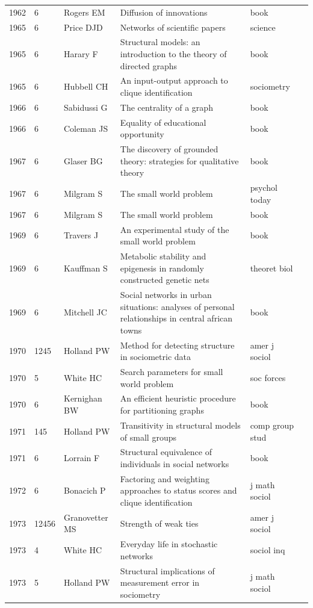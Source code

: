 \documentclass[11pt]{article} %
\begin{document}
\begin{landscape}
\begin{longtable}{p{0.7cm}|p{0.8cm}|p{3cm}|p{14.5cm}|p{3.5cm}l}
1962& 	6& 	 Rogers EM& 	 Diffusion of innovations& 	 book\\
1965& 	6& 	 Price DJD& 	 Networks of scientific papers& 	 science\\
1965& 	6& 	 Harary F& 	 Structural models: an introduction to the theory of directed graphs& 	 book\\
1965& 	6& 	 Hubbell CH & 	An input-output approach to clique identification& 	 sociometry\\
1966& 	6& 	 Sabidussi G& 	 The centrality of a graph& 	 book\\
1966& 	6& 	 Coleman JS& 	 Equality of educational opportunity& 	 book\\
1967& 	6& 	 Glaser BG& 	 The discovery of grounded theory: strategies for qualitative theory& 	 book\\
1967& 	6& 	 Milgram S& 	 The small world problem& 	 psychol today\\
1967& 	6& 	 Milgram S& 	 The small world problem& 	 book\\
1969& 	6& 	 Travers J& 	 An experimental study of the small world problem& 	 book\\
1969& 	6& 	 Kauffman S& 	 Metabolic stability and epigenesis in randomly constructed genetic nets& 	 theoret biol \\
1969& 	6& 	 Mitchell JC& 	 Social networks in urban situations: analyses of personal relationships in central african towns& 	 book\\
1970& 	1245& 	 Holland PW& 	 Method for detecting structure in sociometric data& 	 amer j sociol\\
1970& 	5& 	 White HC& 	 Search parameters for small world problem& 	 soc forces\\
1970& 	6& 	 Kernighan BW& 	 An efficient heuristic procedure for partitioning graphs& 	 book\\
1971& 	145& 	 Holland PW& 	 Transitivity in structural models of small groups& 	 comp group stud\\
1971& 	6& 	 Lorrain F & 	 Structural equivalence of individuals in social networks& 	 book\\
1972& 	6& 	 Bonacich P& 	 Factoring and weighting approaches to status scores and clique identification& 	 j math sociol\\
1973& 	12456& 	 Granovetter MS& 	 Strength of weak ties& 	 amer j sociol\\
1973& 	4& 	 White HC& 	 Everyday life in stochastic networks& 	 sociol inq\\
1973& 	5& 	 Holland PW& 	 Structural implications of measurement error in sociometry& 	 j math sociol\\

\end{longtable}
\end{landscape}
\end{document}
